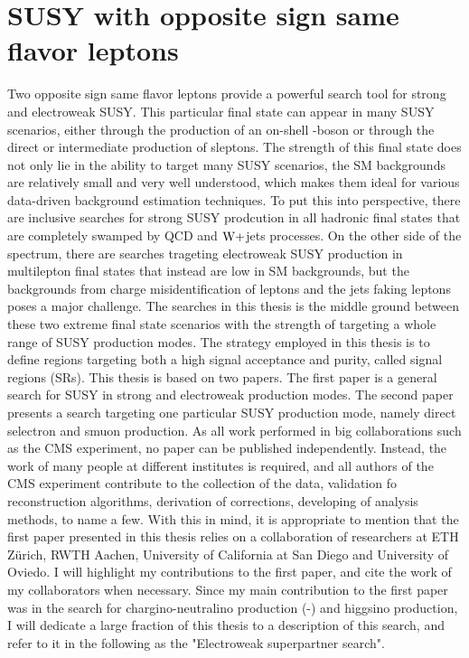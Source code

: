 \section{SUSY with opposite sign same flavor leptons}
\noindent\justify
Two opposite sign same flavor leptons provide a powerful search tool for strong and electroweak SUSY. 
This particular final state can appear in many SUSY scenarios, either through the production of an on-shell \PZ-boson or through the direct or intermediate production of sleptons. 
The strength of this final state does not only lie in the ability to target many SUSY scenarios, the SM backgrounds are relatively small and very well understood, which makes them ideal for various data-driven background estimation techniques. 
To put this into perspective, there are inclusive searches for strong SUSY prodcution in all hadronic final states that are completely swamped by QCD and $\mathrm{W}+$jets processes. 
On the other side of the spectrum, there are searches trageting electroweak SUSY production in multilepton final states that instead are low in SM backgrounds, but the backgrounds from charge misidentification of leptons and the jets faking leptons poses a major challenge. 
The searches in this thesis is the middle ground between these two extreme final state scenarios with the strength of targeting a whole range of SUSY production modes.   
The strategy employed in this thesis is to define regions targeting both a high signal acceptance and purity, called signal regions (SRs).
\newpara
\noindent\justify
This thesis is based on two papers. 
The first paper \cite{Sirunyan:2017qaj} is a general search for SUSY in strong and electroweak production modes. 
The second paper \cite{Sirunyan:2018nwe} presents a search targeting one particular SUSY production mode, namely direct selectron and smuon production.  
As all work performed in big collaborations such as the CMS experiment, no paper can be published independently. 
Instead, the work of many people at different institutes is required, and all authors of the CMS experiment contribute to the collection of the data, validation fo reconstruction algorithms, derivation of corrections, developing of analysis methods, to name a few. 
With this in mind, it is appropriate to mention that the first paper presented in this thesis relies on a collaboration of researchers at ETH Z\"{u}rich, RWTH Aachen, University of California at San Diego and University of Oviedo. 
I will highlight my contributions to the first paper, and cite the work of my collaborators when necessary. 
Since my main contribution to the first paper was in the search for chargino-neutralino production (\firstcharg-\secondchi) and higgsino production, I will dedicate a large fraction of this thesis to a description of this search, and refer to it in the following as the "Electroweak superpartner search".
